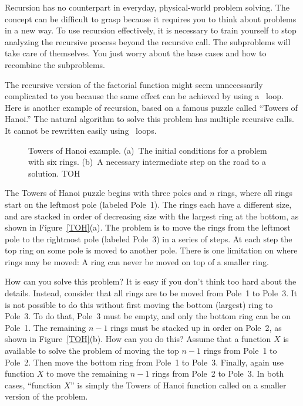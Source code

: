 Recursion has no counterpart in everyday, physical-world problem solving.
The concept can be difficult to grasp because it requires you to think
about problems in a new way.
To use recursion effectively, it is necessary to train yourself to
stop analyzing the recursive process beyond the recursive call.
The subproblems will take care of themselves.
You just worry about the base cases and how to recombine the
subproblems.

The recursive version of the factorial function might seem
unnecessarily complicated to you because the same effect can be
achieved by using a \Cwhile\ loop.
Here is another example of recursion, based on a famous puzzle called
``Towers of Hanoi.''
The natural algorithm to solve this problem has multiple recursive calls.
It cannot be rewritten easily using \Cwhile\ loops.

\begin{figure}

{Towers of Hanoi example.
(a)~The initial conditions for a problem with six rings.
(b)~A necessary intermediate step on the road to a solution.}
{TOH}
\medskip
\end{figure}

The Towers of Hanoi puzzle begins with three poles and \(n\) rings,
where all rings start on the leftmost pole (labeled Pole~1).
The rings each have a different size, and are stacked in order of
decreasing size with the largest ring at the bottom, as shown in
Figure~\ref{TOH}(a).
The problem is to move the rings from the leftmost pole to the
rightmost pole (labeled Pole~3) in a series of steps.
At each step the top ring on some pole is moved to another pole.
There is one limitation on where rings may be moved:
A ring can never be moved on top of a smaller ring.

How can you solve this problem?
It is easy if you don't think too hard about the details.
Instead, consider that all rings are to be moved from Pole~1 to Pole~3.
It is not possible to do this without first moving the bottom
(largest) ring to Pole~3.
To do that, Pole~3 must be empty, and only the bottom ring can be on
Pole~1.
The remaining \(n-1\) rings must be stacked up in order
on Pole~2, as shown in Figure~\ref{TOH}(b).
How can you do this?
Assume that a function \(X\) is available to solve the
problem of moving the top \(n-1\) rings from Pole~1 to Pole~2.
Then move the bottom ring from Pole~1 to Pole~3.
Finally, again use function \(X\) to move the
remaining \(n-1\) rings from Pole~2 to Pole~3.
In both cases, ``function \(X\)'' is simply the Towers of Hanoi
function called on a smaller version of the problem.

